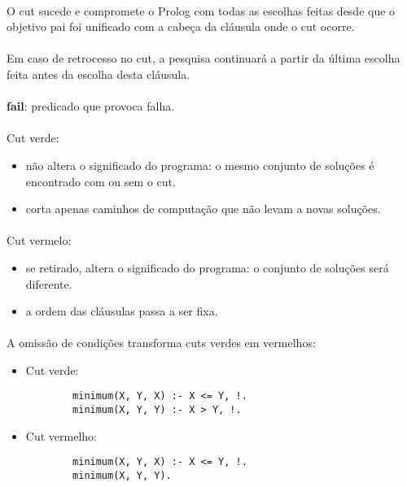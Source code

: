 \documentclass[../resumosPLOG.tex]{subfiles}
\begin{document}
\paragraph{}

O cut sucede e compromete o Prolog com todas as escolhas feitas desde que o objetivo pai foi unificado com a cabeça da cláusula onde o cut ocorre.

\paragraph{}

Em caso de retrocesso no cut, a pesquisa continuará a partir da última escolha feita antes da escolha desta cláusula.

\paragraph{}

\textbf{fail}: predicado que provoca falha.

\paragraph{}

Cut verde:
\begin{itemize}
    \item não altera o significado do programa: o mesmo conjunto de soluções é encontrado com ou sem o cut.
    \item corta apenas caminhos de computação que não levam a novas soluções.
\end{itemize}

\paragraph{}

Cut vermelo:
\begin{itemize}
    \item se retirado, altera o significado do programa: o conjunto de soluções será diferente.
    \item a ordem das cláusulas passa a ser fixa.
\end{itemize}

\paragraph{}

A omissão de condições transforma cuts verdes em vermelhos:
\begin{itemize}
    \item Cut verde:
    \begin{lstlisting}
        minimum(X, Y, X) :- X <= Y, !.
        minimum(X, Y, Y) :- X > Y, !.
    \end{lstlisting}
    \item Cut vermelho:
    \begin{lstlisting}
        minimum(X, Y, X) :- X <= Y, !.
        minimum(X, Y, Y).
    \end{lstlisting}
\end{itemize}
\end{document}
